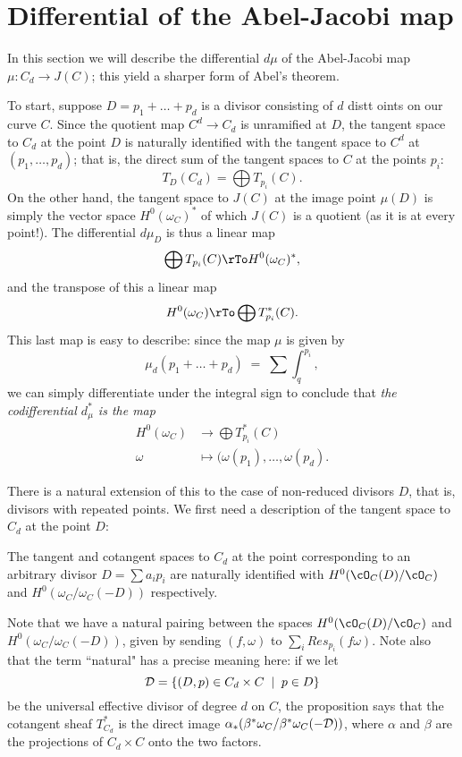 \section{Differential of the Abel-Jacobi map}

In this section we will describe the differential $d\mu$ of the Abel-Jacobi map $\mu : C_d \to J(C)$; this yield a sharper form of Abel's theorem.

To start, suppose $D = p_1 + \dots + p_d$ is a divisor consisting of $d$ distt oints on our curve $C$. Since the quotient map $C^d \to C_d$ is unramified at $D$, the tangent space to $C_d$ at the point $D$ is naturally identified with the tangent space to $C^d$ at $(p_1,\dots,p_d)$; that is, the direct sum of the tangent spaces to $C$ at the points $p_i$:
$$
T_D(C_d) = \bigoplus T_{p_i}(C).
$$
On the other hand, the tangent space to $J(C)$ at the image point $\mu(D)$ is simply the vector space $H^0(\omega_C)^*$ of which $J(C)$ is a quotient (as it is at every point!). The differential $d\mu_D$ is thus a linear map
$$
\bigoplus T_{p_i}(C) \rTo H^0(\omega_C)^*,
$$
and the transpose of this a linear map
$$
H^0(\omega_C) \rTo \bigoplus T^*_{p_i}(C).
$$
This last map is easy to describe: since the map $\mu$ is given by 
$$
\mu_d(p_1 + \dots + p_d) \; = \; \sum \int_q^{p_i},
$$
we can simply differentiate under the integral sign to conclude that \emph{the codifferential $d_\mu^*$ is the map}
\begin{align*}
H^0(\omega_C) &\to \bigoplus T^*_{p_i}(C) \\
\omega &\mapsto (\omega(p_1), \dots, \omega(p_d).
\end{align*}

There is a natural extension of this to the case of non-reduced divisors $D$, that is, divisors with repeated points. We first need a description of the tangent space to $C_d$ at the point $D$:

\begin{proposition}\label{symmetric product tangent space}
The tangent and cotangent spaces to $C_d$ at the point corresponding to an arbitrary divisor $D = \sum a_ip_i$ are naturally identified with $H^0(\cO_C(D)/\cO_C)$ and $H^0(\omega_C/\omega_C(-D))$ respectively.
\end{proposition}

Note that we have a natural pairing between the spaces $H^0(\cO_C(D)/\cO_C)$ and $H^0(\omega_C/\omega_C(-D))$, given by sending $(f, \omega)$ to $\sum_i Res_{p_i}(f\omega)$. Note also that the term ``natural" has a precise meaning here: if we let 
$$
\cD = \{ (D, p) \in C_d \times C \; \mid \; p \in D \}
$$
be the universal effective divisor of degree $d$ on $C$, the proposition says that the cotangent sheaf $T^*_{C_d}$ is the direct image $\alpha_*(\beta^*\omega_C/\beta^*\omega_C(-\cD))$, where $\alpha$ and $\beta$ are the projections of $C_d \times C$ onto the two factors.


